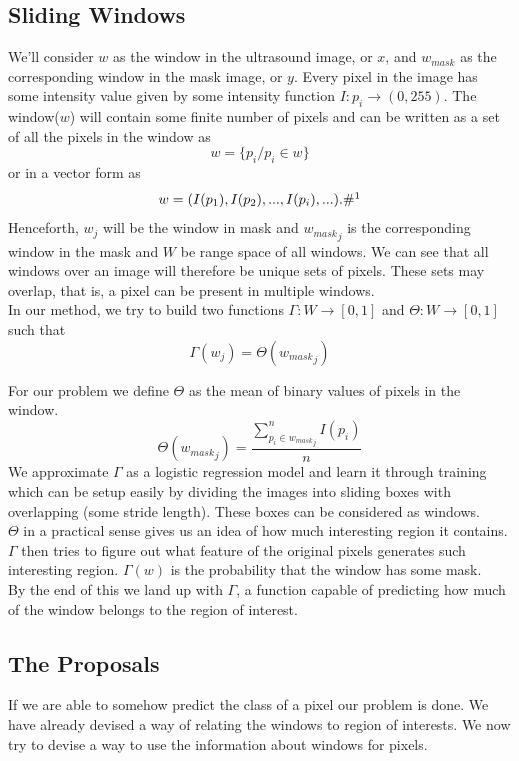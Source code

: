 \documentclass[12pt, a4paper]{article}
\begin{document}
\subsection{Sliding Windows}
We'll consider $w$ as the window in the ultrasound image, or $x$, and $w_{mask}$ as the corresponding window in the mask image, or $y$. Every pixel in the image has some intensity value given by some intensity function $I:p_i \rightarrow (0,255)$. The window($w$) will contain some finite number of pixels and can be written as a set of all the pixels in the window as $$w = \{p_i / p_i \in w\}$$ or in a vector form as $$w = (I(p_1), I(p_2), ..., I(p_i), ...). \#\footnotemark$$
Henceforth, $w_j$ will be the window in mask and ${w_{mask}}_j$ is the corresponding window in the mask and $W$ be range space of all windows. We can see that all windows over an image will therefore be unique sets of pixels. These sets may overlap, that is, a pixel can be present in multiple windows. 
\\
In our method, we try to build two functions $\Gamma: W\rightarrow [0,1]$ and $\Theta: W\rightarrow [0,1]$ such that 
$$\Gamma(w_j) = \Theta({w_{mask}}_j)$$

For our problem we define $\Theta$ as the mean of binary values of pixels in the window.
$$\Theta({w_{mask}}_j) = \frac{\sum\limits_{p_i \in {w_{mask}}_j}^n I(p_i)}{n} $$
We approximate $\Gamma$ as a logistic regression model and learn it through training which can be setup easily by dividing the images into sliding boxes with overlapping (some stride length). These boxes can be considered as windows. 
\\
$\Theta$ in a practical sense gives us an idea of how much interesting region it contains. $\Gamma$ then tries to figure out what feature of the original pixels generates such interesting region. $\Gamma(w)$ is the probability that the window has some mask.\\
By the end of this we land up with $\Gamma$, a function capable of predicting how much of the window belongs to the region of interest.
\subsection{The Proposals}
If we are able to somehow predict the class of a pixel our problem is done. We have already devised a way of relating the windows to region of interests. We now try to devise a way to use the information about windows for pixels. 
\end{document}
